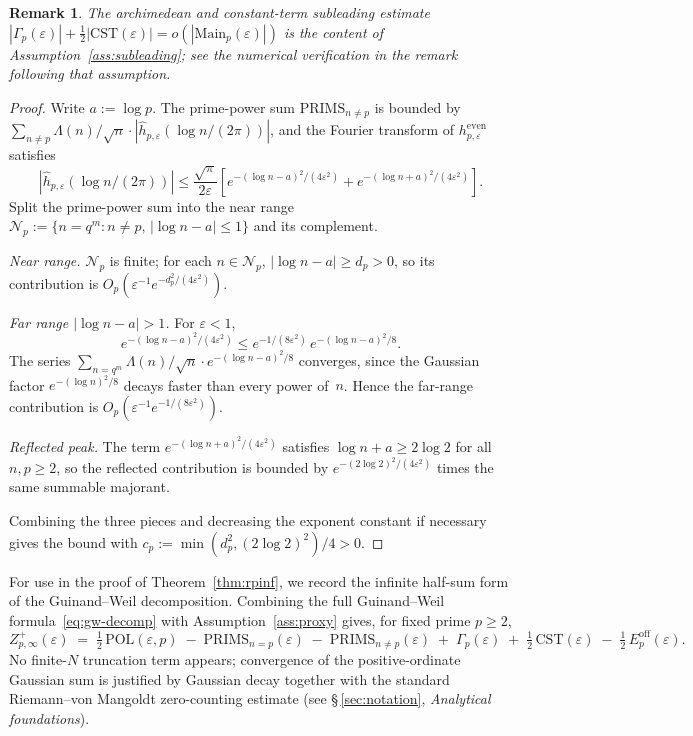 \documentclass[11pt]{article}
\newtheorem*{remark}{Remark}
\begin{document}
\begin{remark}
The archimedean and constant-term subleading estimate
$|\Gamma_p(\varepsilon)|+\tfrac12|\mathrm{CST}(\varepsilon)|
=o(|\mathrm{Main}_p(\varepsilon)|)$
is the content of Assumption~\ref{ass:subleading};
see the numerical verification in the remark following that assumption.
\end{remark}

\begin{proof}
Write $a:=\log p$.
The prime-power sum $\mathrm{PRIMS}_{n\ne p}$ is bounded by
$\sum_{n\ne p}\Lambda(n)/\sqrt{n}\cdot|\hat h_{p,\varepsilon}(\log n/(2\pi))|$,
and the Fourier transform of $h_{p,\varepsilon}^{\mathrm{even}}$ satisfies
\[
|\hat h_{p,\varepsilon}(\log n/(2\pi))|
\le \frac{\sqrt\pi}{2\varepsilon}\!
\left[e^{-(\log n-a)^2/(4\varepsilon^2)}
+e^{-(\log n+a)^2/(4\varepsilon^2)}\right].
\]
Split the prime-power sum into the near range
$\mathcal{N}_p:=\{n=q^m:n\ne p,\,|\log n-a|\le 1\}$
and its complement.

\emph{Near range.}
$\mathcal{N}_p$ is finite; for each $n\in\mathcal{N}_p$,
$|\log n-a|\ge d_p>0$, so its contribution is
$O_p(\varepsilon^{-1}e^{-d_p^2/(4\varepsilon^2)})$.

\emph{Far range $|\log n - a|>1$.}
For $\varepsilon<1$,
\[
e^{-(\log n-a)^2/(4\varepsilon^2)}
\le e^{-1/(8\varepsilon^2)}\,e^{-(\log n-a)^2/8}.
\]
The series $\sum_{n=q^m}\Lambda(n)/\sqrt{n}\cdot e^{-(\log n-a)^2/8}$
converges, since the Gaussian factor $e^{-(\log n)^2/8}$
decays faster than every power of~$n$.
Hence the far-range contribution is
$O_p(\varepsilon^{-1}e^{-1/(8\varepsilon^2)})$.

\emph{Reflected peak.}
The term $e^{-(\log n+a)^2/(4\varepsilon^2)}$ satisfies
$\log n+a\ge 2\log 2$ for all $n,p\ge 2$, so the reflected
contribution is bounded by
$e^{-(2\log 2)^2/(4\varepsilon^2)}$
times the same summable majorant.

Combining the three pieces and decreasing the exponent
constant if necessary gives the bound with
$c_p:=\min(d_p^2,(2\log 2)^2)/4>0$.
\end{proof}

For use in the proof of Theorem~\ref{thm:rpinf}, we record the
infinite half-sum form of the Guinand--Weil decomposition.
Combining the full Guinand--Weil formula~\eqref{eq:gw-decomp}
with Assumption~\ref{ass:proxy} gives, for fixed prime $p\ge 2$,
\[
Z_{p,\infty}^+(\varepsilon)
 \;=\; \tfrac12\,\mathrm{POL}(\varepsilon,p)
       \;-\; \mathrm{PRIMS}_{n=p}(\varepsilon)
       \;-\; \mathrm{PRIMS}_{n\ne p}(\varepsilon)
       \;+\; \Gamma_p(\varepsilon)
       \;+\; \tfrac12\,\mathrm{CST}(\varepsilon)
       \;-\; \tfrac12\,E_p^{\mathrm{off}}(\varepsilon).
\]
No finite-$N$ truncation term appears; convergence of the
positive-ordinate Gaussian sum is justified by Gaussian decay
together with the standard Riemann--von Mangoldt zero-counting
estimate (see \S\,\ref{sec:notation}, \emph{Analytical foundations}).
\end{document}
